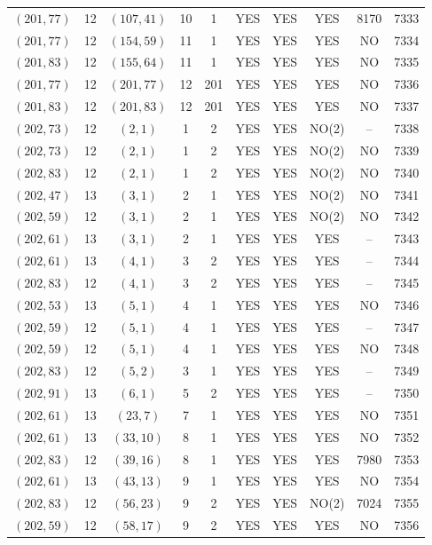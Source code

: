 \begin{longtable}{|c|c|c|c|c|c|c|c|c|c|}
$(201, 77)$ & 12 & $(107, 41)$ & 10 & 1 & YES & YES & YES & 8170 & 7333\\
$(201, 77)$ & 12 & $(154, 59)$ & 11 & 1 & YES & YES & YES & NO & 7334\\
$(201, 83)$ & 12 & $(155, 64)$ & 11 & 1 & YES & YES & YES & NO & 7335\\
$(201, 77)$ & 12 & $(201, 77)$ & 12 & 201 & YES & YES & YES & NO & 7336\\
$(201, 83)$ & 12 & $(201, 83)$ & 12 & 201 & YES & YES & YES & NO & 7337\\
$(202, 73)$ & 12 & $(2, 1)$ & 1 & 2 & YES & YES & NO(2) & -- & 7338\\
$(202, 73)$ & 12 & $(2, 1)$ & 1 & 2 & YES & YES & NO(2) & NO & 7339\\
$(202, 83)$ & 12 & $(2, 1)$ & 1 & 2 & YES & YES & NO(2) & NO & 7340\\
$(202, 47)$ & 13 & $(3, 1)$ & 2 & 1 & YES & YES & NO(2) & NO & 7341\\
$(202, 59)$ & 12 & $(3, 1)$ & 2 & 1 & YES & YES & NO(2) & NO & 7342\\
$(202, 61)$ & 13 & $(3, 1)$ & 2 & 1 & YES & YES & YES & -- & 7343\\
$(202, 61)$ & 13 & $(4, 1)$ & 3 & 2 & YES & YES & YES & -- & 7344\\
$(202, 83)$ & 12 & $(4, 1)$ & 3 & 2 & YES & YES & YES & -- & 7345\\
$(202, 53)$ & 13 & $(5, 1)$ & 4 & 1 & YES & YES & YES & NO & 7346\\
$(202, 59)$ & 12 & $(5, 1)$ & 4 & 1 & YES & YES & YES & -- & 7347\\
$(202, 59)$ & 12 & $(5, 1)$ & 4 & 1 & YES & YES & YES & NO & 7348\\
$(202, 83)$ & 12 & $(5, 2)$ & 3 & 1 & YES & YES & YES & -- & 7349\\
$(202, 91)$ & 13 & $(6, 1)$ & 5 & 2 & YES & YES & YES & -- & 7350\\
$(202, 61)$ & 13 & $(23, 7)$ & 7 & 1 & YES & YES & YES & NO & 7351\\
$(202, 61)$ & 13 & $(33, 10)$ & 8 & 1 & YES & YES & YES & NO & 7352\\
$(202, 83)$ & 12 & $(39, 16)$ & 8 & 1 & YES & YES & YES & 7980 & 7353\\
$(202, 61)$ & 13 & $(43, 13)$ & 9 & 1 & YES & YES & YES & NO & 7354\\
$(202, 83)$ & 12 & $(56, 23)$ & 9 & 2 & YES & YES & NO(2) & 7024 & 7355\\
$(202, 59)$ & 12 & $(58, 17)$ & 9 & 2 & YES & YES & YES & NO & 7356\\

\end{longtable}

